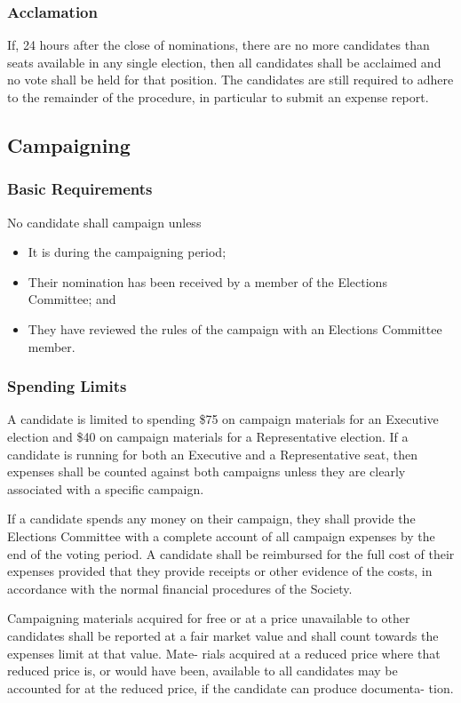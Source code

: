 \subsubsection{Acclamation}
If, 24 hours after the close of nominations, there are no more candidates than
seats available in any single election, then all candidates shall be acclaimed
and no vote shall be held for that position. The candidates are still required
to adhere to the remainder of the procedure, in particular to submit an expense
report.

\subsection{Campaigning}
\subsubsection{Basic Requirements}
No candidate shall campaign unless
\begin{itemize}
\item It is during the campaigning period;
\item Their nomination has been received by a member of the Elections Committee;
and
\item They have reviewed the rules of the campaign with an Elections Committee
member.
\end{itemize}

\subsubsection{Spending Limits}
A candidate is limited to spending \$75 on campaign materials for an Executive
election and \$40 on campaign materials for a Representative election. If a
candidate is running for both an Executive and a Representative seat, then
expenses shall be counted against both campaigns unless they are clearly
associated with a specific campaign.

If a candidate spends any money on their campaign, they shall provide the
Elections Committee with a complete account of all campaign expenses by the end
of the voting period. A candidate shall be reimbursed for the full cost of their
expenses provided that they provide receipts or other evidence of the costs, in
accordance with the normal financial procedures of the Society.

Campaigning materials acquired for free or at a price unavailable to other
candidates shall be reported at a fair market value and shall count towards the
expenses limit at that value. Mate- rials acquired at a reduced price where that
reduced price is, or would have been, available to all candidates may be
accounted for at the reduced price, if the candidate can produce documenta-
tion.

